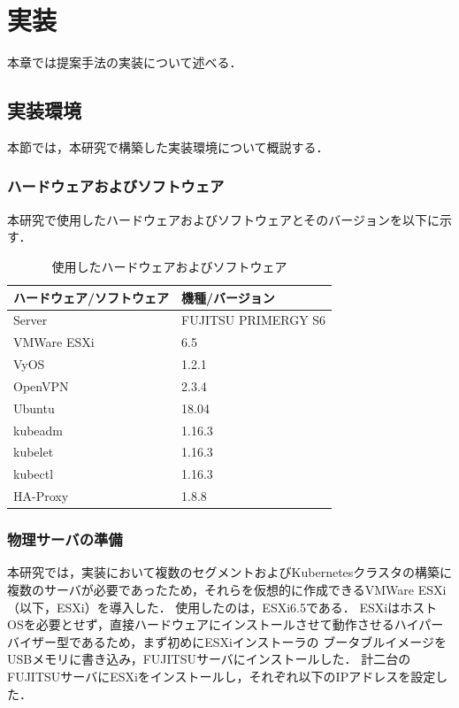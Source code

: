 \chapter{実装}
\label{implementation}

本章では提案手法の実装について述べる．

\section{実装環境}
\label{implementation:environment}

本節では，本研究で構築した実装環境について概説する．

\subsection{ハードウェアおよびソフトウェア}
\label{implementation:environment:resouces}

本研究で使用したハードウェアおよびソフトウェアとそのバージョンを以下に示す．

\begin{table}[htb]
  \begin{center}
    \caption{使用したハードウェアおよびソフトウェア}
    \begin{tabular}{|l|l|} \hline
      ハードウェア/ソフトウェア & 機種/バージョン \\ \hline
      Server & FUJITSU PRIMERGY S6 \\ \hline
      VMWare ESXi & 6.5 \\ \hline
      VyOS & 1.2.1 \\ \hline
      OpenVPN & 2.3.4 \\ \hline
      Ubuntu & 18.04 \\ \hline
      kubeadm & 1.16.3 \\ \hline
      kubelet & 1.16.3 \\ \hline
      kubectl & 1.16.3 \\ \hline
      HA-Proxy & 1.8.8 \\ \hline
    \end{tabular}
  \end{center}
\end{table}

\subsection{物理サーバの準備}
\label{implementation:esxi}

本研究では，実装において複数のセグメントおよびKubernetesクラスタの構築に複数のサーバが必要であったため，それらを仮想的に作成できるVMWare ESXi（以下，ESXi）を導入した．
使用したのは，ESXi6.5である．
ESXiはホストOSを必要とせず，直接ハードウェアにインストールさせて動作させるハイパーバイザー型であるため，まず初めにESXiインストーラの
ブータブルイメージをUSBメモリに書き込み，FUJITSUサーバにインストールした．
計二台のFUJITSUサーバにESXiをインストールし，それぞれ以下のIPアドレスを設定した．

